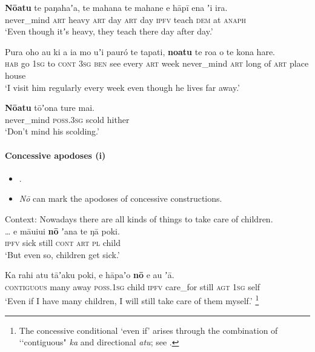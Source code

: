 \begin{exe}
	\ex\label{exAppendixRapaNuiConcessiveP1}
	 \gll\textbf{Nōatu} te paŋahaʼa, te mahana te mahane e hāpī ena ʼi ira.\\
	never\_mind \textsc{art} heavy \textsc{art} day \textsc{art} day \textsc{ipfv} teach \textsc{dem} at \textsc{anaph}\\
	\glt \lq Even though itʼs heavy, they teach there day after day.\rq{ }\parencite[570]{Kieviet2017}

	\ex\label{exAppendixRapaNuiConcessiveP2}
	 \gll Pura oho au ki a ia mo uʼi pauró te tapati, \textbf{noatu} te roa o te kona hare.\\
	 \textsc{hab} go 1\textsc{sg} to \textsc{cont} 3\textsc{sg} \textsc{ben} see every \textsc{art} week never\_mind \textsc{art} long of \textsc{art} place house\\
	 \glt \lq I visit him regularly every week even though he lives far away.\rq{ }\parencite[59]{duFeu1996}

	\ex\label{exAppendixRapaNuiConcessiveP3}
	\gll\textbf{Nōatu} tōʼona ture mai.\\
	 never\_mind \textsc{poss}.3\textsc{sg} scold hither\\
	 \glt \lq Don't mind his scolding.' \parencite[305]{Kieviet2017}
\end{exe}

\paragraph{Concessive apodoses (i)}
\label{appendixRapaNuiConcessiveConsequent1}
\begin{itemize}
	\item \textcite[343]{Kieviet2017}.
	\item \textit{Nō} can mark the apodoses of concessive constructions.
\end{itemize}

\begin{exe}
	\ex \label{exAppendixRapaNuiConcessiveQ1}
	Context: Nowadays there are all kinds of things to take care of children.\\
	\gll  … e māuiui \textbf{nō} ʼana te ŋā poki.\\
	{} \textsc{ipfv} sick still \textsc{cont} \textsc{art} \textsc{pl} child\\
	\glt \lq But even so, children get sick.' \parencite[343]{Kieviet2017}

	\ex \label{exAppendixRapaNuiConcessiveQ2}
	\gll Ka rahi atu tāʼaku poki, e hāpaʼo \textbf{nō} e au ʼā.\\
	\textsc{contiguous} many away \textsc{poss}.1\textsc{sg} child \textsc{ipfv} care\_for still \textsc{agt} 1\textsc{sg} self\\
	\glt \lq Even if I have many children, I will still take care of them myself.' \parencite[344]{Kieviet2017}\footnote{The concessive conditional \lq even if' arises through the combination of \lq\lq contiguous" \textit{ka} and directional \textit{atu}; see \textcite[569–570]{Kieviet2017}.}
\end{exe}


